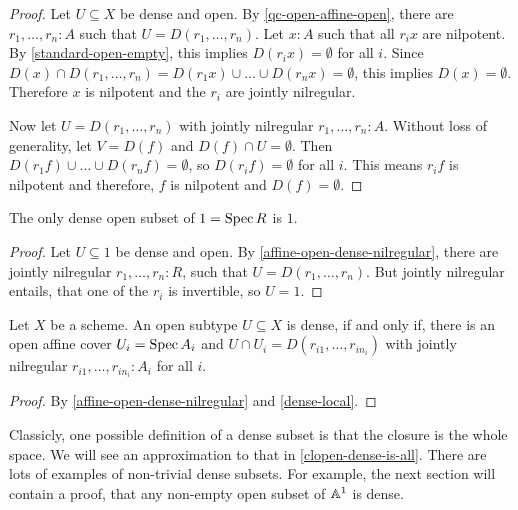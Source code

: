 \begin{proof}
  Let $U\subseteq X$ be dense and open.
  By \cref{qc-open-affine-open}, there are $r_1,\dots,r_n:A$ such that $U=D(r_1,\dots,r_n)$.
  Let $x:A$ such that all $r_ix$ are nilpotent.
  By \cref{standard-open-empty}, this implies $D(r_ix)=\emptyset$ for all $i$.
  Since $D(x)\cap D(r_1,\dots,r_n)=D(r_1x)\cup\dots\cup D(r_nx)=\emptyset$,
  this implies $D(x)=\emptyset$.
  Therefore $x$ is nilpotent and the $r_i$ are jointly nilregular.

  Now let $U=D(r_1,\dots,r_n)$ with jointly nilregular $r_1,\dots,r_n:A$.
  Without loss of generality, let $V=D(f)$ and $D(f)\cap U=\emptyset$.
  Then $D(r_1f)\cup \dots \cup D(r_nf)=\emptyset$, so $D(r_if)=\emptyset$ for all $i$.
  This means $r_if$ is nilpotent and therefore, $f$ is nilpotent and $D(f)=\emptyset$.
\end{proof}

\begin{corollary}%
  The only dense open subset of $1=\operatorname{Spec} R$ is $1$.
\end{corollary}

\begin{proof}
  Let $U\subseteq 1$ be dense and open.
  By \cref{affine-open-dense-nilregular},
  there are jointly nilregular $r_1,\dots,r_n:R$,
  such that $U=D(r_1,\dots,r_n)$.
  But jointly nilregular entails,
  that one of the $r_i$ is invertible, so $U=1$.
\end{proof}

\begin{theorem}%
  \label{dense-is-jointly-nilregular}
  Let $X$ be a scheme.
  An open subtype $U\subseteq X$ is dense,
  if and only if, there is an open affine cover $U_i=\operatorname{Spec} A_i$
  and $U\cap U_i=D(r_{i1},\dots,r_{in_i})$ with jointly nilregular $r_{i1},\dots,r_{in_i}:A_i$ for all $i$.
\end{theorem}

\begin{proof}
  By \cref{affine-open-dense-nilregular} and \cref{dense-local}.
\end{proof}

Classicly, one possible definition of a dense subset
is that the closure is the whole space.
We will see an approximation to that in \cref{clopen-dense-is-all}.
There are lots of examples of non-trivial dense subsets.
For example, the next section will contain a proof,
that any non-empty open subset of $\mathbb{A}^1$ is dense.

